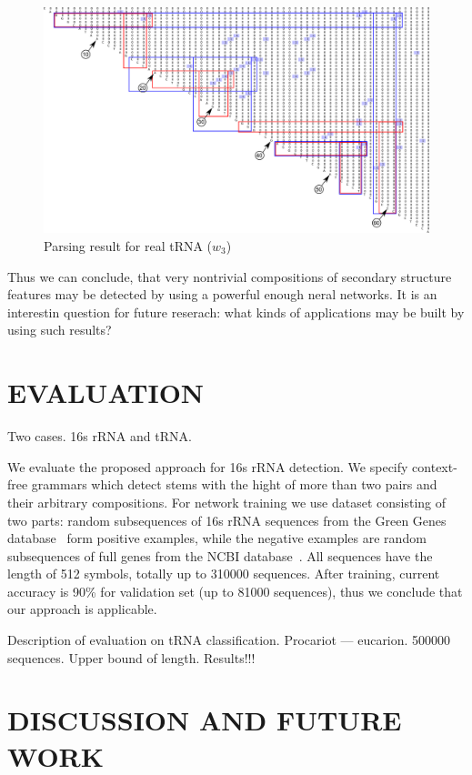 \documentclass[a4paper,twoside]{article}
\begin{document}
\begin{figure}
\centering
\includegraphics[width=.98\textwidth]{figures/0m.pdf}
\caption{Parsing result for real tRNA ($w_3$)}
\label{fig:real-trna}
\end{figure}

Thus we can conclude, that very nontrivial compositions of secondary structure features may be detected by using a powerful enough neral networks.
It is an interestin question for future reserach: what kinds of applications may be built by using such results?


\section{\uppercase{Evaluation}}
\label{sec:evaluation}

Two cases. 
16s rRNA and tRNA.

\noindent We evaluate the proposed approach for 16s rRNA detection.
We specify context-free grammars which detect stems with the hight of more than two pairs and their arbitrary compositions.
For network training we use dataset consisting of two parts: random subsequences of 16s rRNA sequences from the Green Genes database~\cite{pmid16820507} form positive examples, while the negative examples are random subsequences of full genes from the NCBI database~\cite{pmid19854944}.
All sequences have the length of 512 symbols, totally up to 310000 sequences.
After training, current accuracy is 90\% for validation set (up to 81000 sequences), thus we conclude that our approach is applicable.

Description of evaluation on tRNA classification.
Procariot --- eucarion.
500000 sequences.
Upper bound of length.
Results!!!


\section{\uppercase{Discussion and Future Work}}
\label{sec:Discussion}
\end{document}
